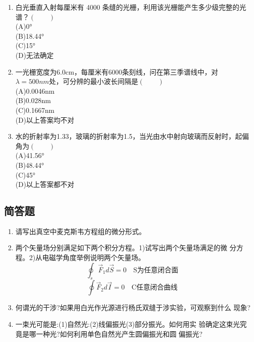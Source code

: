 \begin{enumerate}
(C)0.4mm\\
(D)4mm
\item 白光垂直入射每厘米有 4000 条缝的光栅，利用该光栅能产生多少级完整的光谱？$(\qquad)$\\
(A)0°\\
(B)18.44°\\
(C)15°\\
(D)无法确定
\item 一光栅宽度为6.0cm，每厘米有6000条刻线，问在第三季谱线中，对$\lambda=500nm$处，可分辨的最小波长间隔是$(\qquad)$\\
(A)0.0046nm\\
(B)0.028nm\\
(C)0.1667nm\\
(D)以上答案均不对
\item 水的折射率为1.33，玻璃的折射率为1.5，当光由水中射向玻璃而反射时，起偏角为$(\qquad)$\\
(A)41.56°\\
(B)48.44°\\
(C)45°\\
(D)以上答案都不对
\end{enumerate}
\subsection{简答题}
\begin{enumerate}
\item 请写出真空中麦克斯韦方程组的微分形式。
\item 两个矢量场分别满足如下两个积分方程。1)试写出两个矢量场满足的微
分方程。2)从电磁学角度举例说明两个矢量场。
\begin{equation}
\oint_s \vec F_1d\vec S=0 \quad \text{S为任意闭合面}~
\end{equation}
\begin{equation}
\oint \vec F_2d\vec I=0 \quad \text{C任意闭合曲线}~
\end{equation}
\item 何谓光的干涉?如果用白光作光源进行杨氏双缝于涉实验，可观察到什么
现象?
\item 一束光可能是:(1)自然光:(2)线偏振光(3)部分振光。如何用实
验确定这束光究竟是哪一种光?如何利用单色自然光产生圆偏振光和圆
偏振光?
\end{enumerate}
